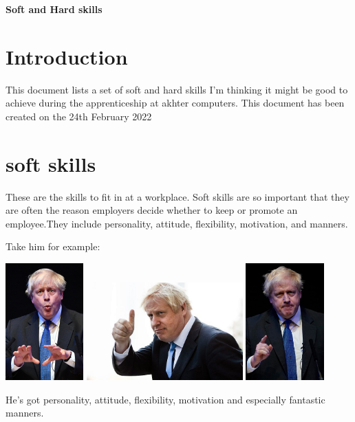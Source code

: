 \documentclass[a4paper,12pt]{article}
\begin{document}
\textbf{Soft and Hard skills}


\tableofcontents
\clearpage

 
\section{Introduction}
This document lists a set of soft and hard skills I'm thinking it might be good to achieve during the apprenticeship at akhter computers. This document has been created on the 24th February 2022

\section{soft skills}
These are the skills to fit in at a workplace. Soft skills are so important that they are often the reason employers decide whether to keep or promote an employee.They include personality, attitude, flexibility, motivation, and manners.

Take him for example:

\includegraphics[width=3cm]{./boris-soft.jpg}
\includegraphics[width=6cm]{./boris-soft3.jpg}
\includegraphics[width=3cm]{./boris-soft2.jpg}

He's got personality, attitude, flexibility, motivation and especially fantastic manners.
\end{document}
